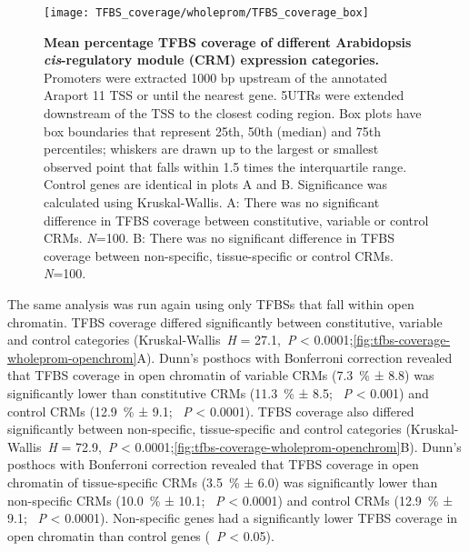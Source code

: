 \documentclass[../main.tex]{subfiles}
\begin{document}
{{\begin{figure}[hbt!]
	\begin{center}
		\capstart
		\texttt{[image: TFBS\_coverage/wholeprom/TFBS\_coverage\_box]}
		\caption{
			\textbf{Mean percentage TFBS coverage of different Arabidopsis \textit{cis}\hyp{}regulatory module (CRM) expression categories.}
			Promoters were extracted 1000 bp upstream of the annotated Araport 11 \autocite{chengAraport11CompleteReannotation2017} TSS or until the nearest gene.
			5UTRs were extended downstream of the TSS to the closest coding region.  Box plots have box boundaries that represent 25th, 50th (median) and 75th percentiles; whiskers are drawn up to the largest or smallest observed point that falls within 1.5 times the interquartile range.
			Control genes are identical in plots A and B.
			Significance was calculated using Kruskal\hyp{}Wallis.
			A: There was no significant difference in TFBS coverage between constitutive, variable or control CRMs. \textit{N}=100.
			B: There was no significant difference in TFBS coverage between non\hyp{}specific, tissue\hyp{}specific or control CRMs. \textit{N}=100.
			\label{fig:tfbs-coverage-wholeprom}
		}
	\end{center}
\end{figure}
The same analysis was run again using only TFBSs that fall within open chromatin. TFBS coverage differed significantly between constitutive, variable and control categories (Kruskal\hyp{}Wallis~\textit{H} = 27.1,~\textit{P} \textless{} 0.0001;\autoref{fig:tfbs-coverage-wholeprom-openchrom}A).
Dunn's posthocs with Bonferroni correction revealed that TFBS coverage in open chromatin of variable CRMs (\SI{7.3}{\percent} ± 8.8) was significantly lower than constitutive CRMs (\SI{11.3}{\percent} ± 8.5; ~\textit{P} \textless{} 0.001) and control CRMs (\SI{12.9}{\percent} ± 9.1; ~\textit{P} \textless{} 0.0001).
TFBS coverage also differed significantly between non\hyp{}specific, tissue\hyp{}specific and control categories (Kruskal\hyp{}Wallis~\textit{H} = 72.9,~\textit{P} \textless{} 0.0001;\autoref{fig:tfbs-coverage-wholeprom-openchrom}B).
Dunn's posthocs with Bonferroni correction revealed that TFBS coverage in open chromatin of tissue\hyp{}specific CRMs (\SI{3.5}{\percent} ± 6.0) was significantly lower than non\hyp{}specific CRMs (\SI{10.0}{\percent} ± 10.1; ~\textit{P} \textless{} 0.0001) and control CRMs (\SI{12.9}{\percent} ± 9.1; ~\textit{P} \textless{} 0.0001).
Non\hyp{}specific genes had a significantly lower TFBS coverage in open chromatin than control genes (~\textit{P} \textless{} 0.05).

}}
\end{document}
